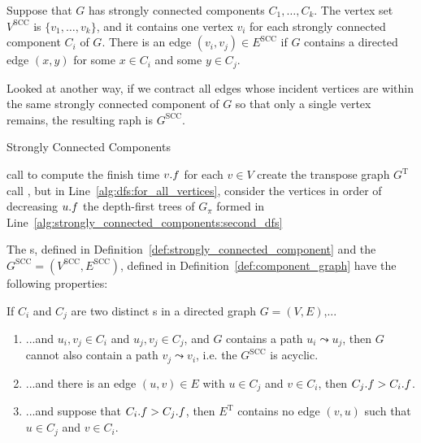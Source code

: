 \begin{definition}\label{def:component_graph}
Suppose that $G$ has strongly connected components $C_1, \ldots, C_k$. 
The vertex set $V^{\mathrm{SCC}}$ is $\{v_1, \ldots, v_k\}$, and it contains one vertex $v_i$ for each strongly connected component $C_i$ of $G$. 
There is an edge $(v_i, v_j) \in E^{\mathrm{SCC}}$ if $G$ contains a directed edge $(x, y)$ for some $x \in C_i$ and some $y \in C_j$. 

Looked at another way, if we contract all edges whose incident vertices are within the same strongly connected component of $G$ so that only a single vertex remains, the resulting raph is $G^{\mathrm{SCC}}$.
\end{definition}

\begin{algorithm}[h]
\caption{Strongly Connected Components}\label{alg:strongly_connected_components}
\begin{algorithmic}[1]
  \State call  to compute the finish time \(v\mathtt{.}f\) for each \(v\in V\) \label{alg:strongly_connected_components:first_dfs}
  \State create the transpose graph \(G^{\mathrm{T}}\)
  \State call , but in Line~\ref{alg:dfs:for_all_vertices}, consider the vertices in order of decreasing \(u\mathtt{.}f\) \label{alg:strongly_connected_components:second_dfs}
  \State \Return the depth-first trees of \(G_\pi\) formed in Line~\ref{alg:strongly_connected_components:second_dfs}
  \EndFunction
\end{algorithmic}
\end{algorithm}



The s, defined in Definition~\ref{def:strongly_connected_component} and the  $G^{\mathrm{SCC}}=(V^{\mathrm{SCC}}, E^{\mathrm{SCC}})$, defined in Definition~\ref{def:component_graph} have the following properties:

If $C_i$ and $C_j$ are two distinct s in a directed graph \(G=(V,E)\),...
\begin{enumerate}
  \item ...and \(u_i, v_j \in C_i\) and \(u_j, v_j \in C_j\), and \(G\) contains a path \(u_i \leadsto u_j\), then \(G\) cannot also contain a path \(v_j \leadsto v_i\), i.e. the  $G^{\mathrm{SCC}}$ is acyclic. \label{properties_component_graph:acyclic}
  \item ...and there is an edge \((u, v) \in E\) with \(u \in C_j\) and \(v \in C_i\), then \(C_j\mathtt{.}f > C_i\mathtt{.}f\). \label{properties_component_graph:finish_time}
  \item ...and suppose that \(C_i\mathtt{.}f > C_j\mathtt{.}f\), then \(E^{\mathrm{T}}\) contains no edge \((v, u)\) such that \(u \in C_j\) and \(v \in C_i\). \label{properties_component_graph:transposed_edges}
\end{enumerate}

